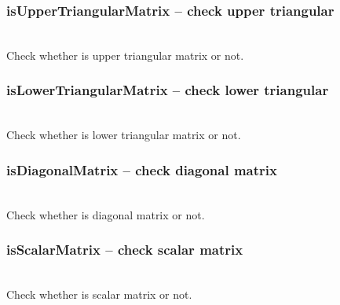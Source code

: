 \subsubsection{isUpperTriangularMatrix -- check upper triangular}
   \\
   \spacing
   \quad Check whether  is upper triangular matrix or not.\\
   \spacing
\subsubsection{isLowerTriangularMatrix -- check lower triangular}
   \\
   \spacing
   \quad Check whether  is lower triangular matrix or not.\\
   \spacing
\subsubsection{isDiagonalMatrix -- check diagonal matrix}
   \\
   \spacing
   \quad Check whether  is diagonal matrix or not.\\
   \spacing
\subsubsection{isScalarMatrix -- check scalar matrix}
   \\
   \spacing
   \quad Check whether  is scalar matrix or not.\\
   \spacing
